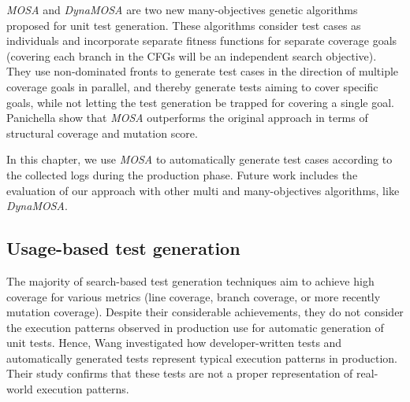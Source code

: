 
\textit{MOSA} \cite{Panichella2015} and \textit{DynaMOSA} \cite{Panichella2018} are two new many-objectives genetic algorithms proposed for unit test generation. These algorithms consider test cases as individuals and incorporate separate fitness functions for separate coverage goals (\eg covering each branch in the CFGs will be an independent search objective). They use non-dominated fronts to generate test cases in the direction of multiple coverage goals in parallel, and thereby generate tests aiming to cover specific goals, while not letting the test generation be trapped for covering a single goal. Panichella \etal \cite{Panichella2015} show that \textit{MOSA} outperforms the original \evosuite approach in terms of structural coverage and mutation score.

In this chapter, we use \textit{MOSA} to automatically generate test cases according to the collected logs during the production phase. Future work includes the evaluation of our approach with other multi and many-objectives algorithms, like \textit{DynaMOSA}.

\subsection{Usage-based test generation}
\label{sec:cub:usage-based-test-generation}

The majority of search-based test generation techniques aim to achieve high coverage for various metrics (\eg line coverage, branch coverage, or more recently mutation coverage).
Despite their considerable achievements, they do not consider the execution patterns observed in production use for automatic generation of unit tests. Hence, Wang \etal \cite{Wang2017} investigated how developer-written tests and automatically generated tests represent typical execution patterns in production. Their study confirms that these tests are not a proper representation of real-world execution patterns.

